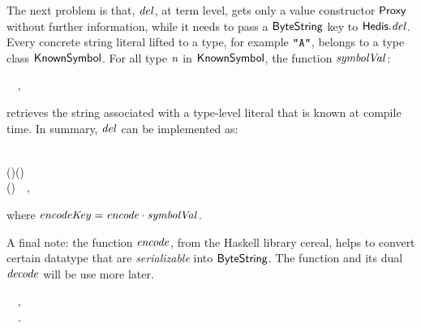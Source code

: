 The next problem is that, \ensuremath{\Varid{del}}, at term level, gets only a value constructor
\ensuremath{\Conid{Proxy}} without further information, while it needs to pass a \ensuremath{\Conid{ByteString}} key
to \ensuremath{\Varid{\Conid{Hedis}.del}}. Every concrete string literal lifted to a type, for example
\ensuremath{\text{\tt \char34 A\char34}}, belongs to a type class \ensuremath{\Conid{KnownSymbol}}. For all type \ensuremath{\Varid{n}} in \ensuremath{\Conid{KnownSymbol}},
the function \ensuremath{\Varid{symbolVal}}:\begin{hscode}\SaveRestoreHook
{}%
%
%
\>[3]{}\mathbin{::}\;\Rightarrow {}\;\to {}~~,{}\<[E]%
\ColumnHook
\end{hscode}\resethooks
retrieves the string associated with a type-level literal that is known at
compile time. In summary, \ensuremath{\Varid{del}} can be implemented as:
\begin{hscode}\SaveRestoreHook
{}%
%
%
%
\>[B]{}\<[6]%
\>[6]{}\mathbin{::}\;\<[E]%
\\
\>[6]{}\Rightarrow {}\;\to {}\;\;(\;\;)\;(\;\;){}\<[E]%
\\
\>[B]{}\;\mathrel{=}\;(){}\<[45]%
\>[45]{}~~,{}\<[E]%
\ColumnHook
\end{hscode}\resethooks
where \ensuremath{\Varid{encodeKey}\mathrel{=}\Varid{encode}\mathbin{\cdot}\Varid{symbolVal}}.

A final note: the function \ensuremath{\Varid{encode}}, from the Haskell library {\sc cereal},
helps to convert certain datatype that are {\em serializable} into \ensuremath{\Conid{ByteString}}.
The function and its dual \ensuremath{\Varid{decode}} will be use more later.
\begin{hscode}\SaveRestoreHook
{}%
%
%
\>[B]{}\<[9]%
\>[9]{}\mathbin{::}\;\Rightarrow {}\to {}~~,{}\<[E]%
\\
\>[B]{}\<[9]%
\>[9]{}\mathbin{::}\;\Rightarrow {}\to {}\;\;~~.{}\<[E]%
\ColumnHook
\end{hscode}\resethooks

